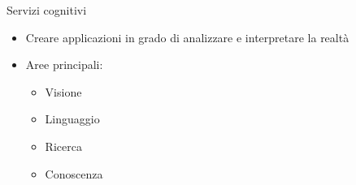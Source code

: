 %
\begin{frame}[t]{Servizi cognitivi}
\begin{itemize}
	\item Creare applicazioni in grado di analizzare e interpretare la realtà
	\item Aree principali:
	\begin{itemize}
		\item Visione
		\item Linguaggio
		\item Ricerca
		\item Conoscenza
	\end{itemize}
\end{itemize}
\end{frame}
%
